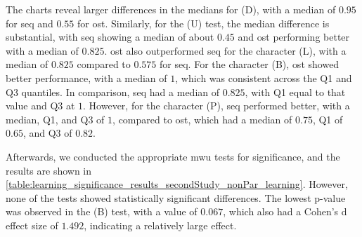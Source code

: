 The charts reveal larger differences in the medians for (D), with a median of $0.95$ for \gls{seq} and $0.55$ for \gls{ost}.
Similarly, for the (U) test, the median difference is substantial, with \gls{seq} showing a median of about $0.45$ and \gls{ost} performing better with a median of $0.825$.
\gls{ost} also outperformed \gls{seq} for the character (L), with a median of $0.825$ compared to $0.575$ for \gls{seq}.
For the character (B), \gls{ost} showed better performance, with a median of $1$, which was consistent across the Q1 and Q3 quantiles. In comparison, \gls{seq} had a median of $0.825$, with Q1 equal to that value and Q3 at $1$.
However, for the character (P), \gls{seq} performed better, with a median, Q1, and Q3 of $1$, compared to \gls{ost}, which had a median of $0.75$, Q1 of $0.65$, and Q3 of $0.82$.

Afterwards, we conducted the appropriate \gls{mwu} tests for significance, and the results are shown in \autoref{table:learning_significance_results_secondStudy_nonPar_learning}.
However, none of the tests showed statistically significant differences.
The lowest p-value was observed in the (B) test, with a value of $0.067$, which also had a Cohen's d effect size of $1.492$, indicating a relatively large effect.

\begin{table}[ht]
\caption{Results of the \gls{mwu} tests for significance grouped by the different Braille characters during training for the different Encodings with Cohen's d.}
\label{table:learning_significance_results_secondStudy_nonPar_learning}
\end{table}

